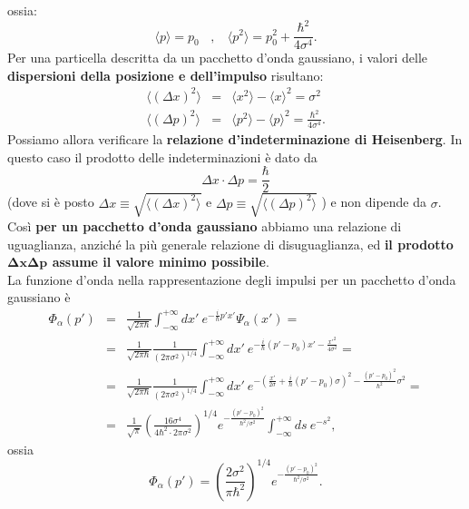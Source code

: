 ossia:
\begin{equation}
\langle p \rangle = p_0~~~~, ~~~~\langle p^2 \rangle = p_0^2 + \frac{\hbar^2}{4 \sigma^4}.
\end{equation}
Per una particella descritta da un pacchetto d'onda gaussiano, i valori delle \textbf{dispersioni della posizione e dell'impulso} risultano:
\begin{eqnarray}
\langle (\Delta x)^2 \rangle &=& \langle x^2 \rangle - \langle x \rangle^2 = \sigma^2\\
\langle (\Delta p)^2 \rangle &=& \langle p^2 \rangle - \langle p \rangle^2 =  \frac{\hbar^2}{4 \sigma^4}.
\end{eqnarray}
Possiamo allora verificare la \textbf{relazione d'indeterminazione di Heisenberg}. In questo caso il prodotto delle indeterminazioni è dato da
\begin{equation}
\Delta x \cdot \Delta p = \frac{\hbar}{2}
\end{equation}
(dove si è posto $\Delta x \equiv \sqrt{\langle (\Delta x)^2 \rangle}$ e $\Delta p \equiv \sqrt{\langle (\Delta p)^2 \rangle}$ ) e non dipende da $\sigma$. Così \textbf{per un pacchetto d'onda gaussiano} abbiamo una relazione di uguaglianza, anziché la più generale relazione di disuguaglianza, ed \textbf{il prodotto $\mathbf{\Delta x \Delta p}$ assume il valore minimo possibile}.\\
La funzione d'onda nella rappresentazione degli impulsi per un pacchetto d'onda gaussiano è
\begin{eqnarray}
\Phi_\alpha(p') &=& \frac{1}{\sqrt{2 \pi \hbar}} \int_{-\infty}^{+\infty} dx'~ e^{-\frac{i}{\hbar} p' x'} \Psi_\alpha(x') = \\
&=& \frac{1}{\sqrt{2 \pi \hbar}} \frac{1}{(2 \pi \sigma^2)^{1/4}} \int_{-\infty}^{+\infty} dx'~ e^{-\frac{i}{\hbar} (p'-p_0) x' - \frac{x'^2}{4 \sigma^2}} = \nonumber \\
&=& \frac{1}{\sqrt{2 \pi \hbar}} \frac{1}{(2 \pi \sigma^2)^{1/4}} \int_{-\infty}^{+\infty} dx'~ e^{-\left(\frac{x'}{2 \sigma} + \frac{i}{\hbar} (p'-p_0) \sigma \right)^2 - \frac{(p'-p_0)^2}{\hbar^2}\sigma^2} = \nonumber \\
&=&  \frac{1}{\sqrt{\pi}} \left(\frac{16 \sigma^4}{4 \hbar^2 \cdot 2 \pi \sigma^2} \right)^{1/4} e^{-\frac{(p'-p_0)^2}{\hbar^2/\sigma^2}} \int_{-\infty}^{+\infty} ds ~e^{-s^2},
\end{eqnarray}
ossia
\begin{equation}
\Phi_\alpha(p') = \left(\frac{2 \sigma^2}{\pi \hbar^2} \right)^{1/4} e^{-\frac{(p'-p_0)^2}{\hbar^2/\sigma^2}}.
\end{equation}
